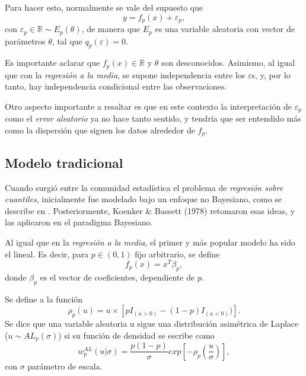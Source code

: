 Para hacer esto, normalmente se vale del supuesto que
\begin{equation*}
    y = f_p(x) + \varepsilon_p,
\end{equation*}
con $\varepsilon_p \in \mathbb{R} \sim E_p(\theta)$, de manera que $E_p$ es una variable aleatoria con vector de par\'ametros $\theta$, tal que $q_p(\varepsilon) = 0$. 

Es importante aclarar que $f_p(x) \in \mathbb{R}$ y $\theta$ son desconocidos. Asimismo, al igual que con la \textit{regresi\'on a la media}, se supone independencia entre los $\varepsilon$s, y, por lo tanto, hay independencia condicional entre las observaciones.

Otro aspecto importante a resaltar es que en este contexto la interpretaci\'on de $\varepsilon_p$ como el \textit{error aleatorio} ya no hace tanto sentido, y tendr\'ia que ser entendido m\'as como la dispersi\'on que siguen los datos alrededor de $f_p$.

\subsection{Modelo tradicional}

Cuando surgi\'o entre la comunidad estad\'istica el problema de \textit{regresi\'on sobre cuantiles}, inicialmente fue modelado bajo un enfoque no Bayesiano, como se describe en \cite{Yu_BayQuantReg}.  Posteriormente, Koenker \& Bassett (1978) retomaron esas ideas, y las aplicaron en el paradigma Bayesiano. 

Al igual que en la \textit{regresi\'on a la media}, el primer y m\'as popular modelo ha sido el lineal. Es decir, para $p \in (0,1)$ fijo arbitrario, se define
\begin{equation*}
    f_p(x) = x^T\beta_p, 
\end{equation*}
donde $\beta_p$ es el vector de coeficientes, dependiente de $p$.

\begin{defin}
    Se define a la funci\'on
    \begin{equation*}
        \rho_p(u) = u \times [pI_{(u>0)} - (1-p) I_{(u<0)})].
    \end{equation*}
    Se dice que una variable aleatoria u sigue una distribuci\'on asim\'etrica de Laplace ($u \sim AL_p(\sigma)$) si su funci\'on de densidad se escribe como
    \begin{equation*}
        w_p^{AL}(u|\sigma) = 
        \frac{p(1-p)}{\sigma}
        exp\left[
        -\rho_p
        \left(
        \frac{u}{\sigma}
        \right)
        \right],
    \end{equation*}
con $\sigma$ par\'ametro de escala.
\end{defin}

